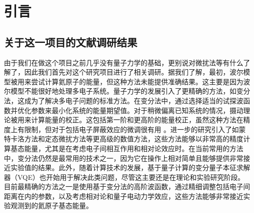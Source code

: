 
\section{引言}
\subsection{关于这一项目的文献调研结果}
由于我们在做这个项目之前几乎没有量子力学的基础，更别说对微扰法等有什么了解了，因此我们首先对这个研究项目进行了相关调研。据我们了解，最初，波尔模型被用来尝试计算氦原子的能量，但这种方法未能提供准确结果。这主要是因为波尔模型不能很好地处理多电子系统。量子力学的发展引入了更精确的方法，如变分法，这成为了解决多电子问题的标准方法。在变分法中，通过选择适当的试探波函数并优化参数来最小化系统的能量期望值。对于稍微偏离已知系统的情况，摄动理论被用来计算能量的校正。这包括第一阶和更高阶的能量校正，虽然这种方法在精度上有限制，但对于包括电子屏蔽效应的微调很有用 。进一步的研究引入了如蒙特卡洛方法和定态微扰方法等更高级的数值方法，这些方法能够以非常高的精度计算基态能量，尤其是在考虑电子间相互作用和相对论效应时。在当前常用的方法中，变分法仍然是最常用的技术之一，因为它在操作上相对简单且能够提供非常接近实验值的结果。此外，随着计算技术的发展，基于量子计算的变分量子本征求解器（VQE）也开始用于解决此类问题，尽管这主要还是在理论和实验研究阶段。目前最精确的方法之一是使用基于变分法的高阶波函数，通过精细调整包括电子间距离在内的参数，以及考虑相对论和量子电动力学效应，这些方法能够非常接近实验观测到的氦原子基态能量。

